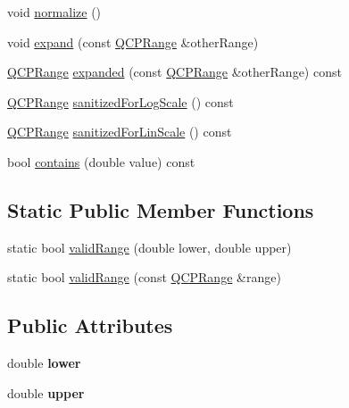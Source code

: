 \begin{DoxyCompactItemize}
\item 
void \mbox{\hyperlink{class_q_c_p_range_af914a7740269b0604d0827c634a878a9}{normalize}} ()
\item 
void \mbox{\hyperlink{class_q_c_p_range_a0fa1bc8048be50d52bea93a8caf08305}{expand}} (const \mbox{\hyperlink{class_q_c_p_range}{Q\+C\+P\+Range}} \&other\+Range)
\item 
\mbox{\hyperlink{class_q_c_p_range}{Q\+C\+P\+Range}} \mbox{\hyperlink{class_q_c_p_range_a9cbfb7cd06eac1839cae981e05c19633}{expanded}} (const \mbox{\hyperlink{class_q_c_p_range}{Q\+C\+P\+Range}} \&other\+Range) const
\item 
\mbox{\hyperlink{class_q_c_p_range}{Q\+C\+P\+Range}} \mbox{\hyperlink{class_q_c_p_range_a3d66288d66e1d6df3636075eb42502ee}{sanitized\+For\+Log\+Scale}} () const
\item 
\mbox{\hyperlink{class_q_c_p_range}{Q\+C\+P\+Range}} \mbox{\hyperlink{class_q_c_p_range_a808751fdd9b17ef52327ba011df2e5f1}{sanitized\+For\+Lin\+Scale}} () const
\item 
bool \mbox{\hyperlink{class_q_c_p_range_ae9842b48b6d38dc5e9607358e3083cc8}{contains}} (double value) const
\end{DoxyCompactItemize}
\subsection*{Static Public Member Functions}
\begin{DoxyCompactItemize}
\item 
static bool \mbox{\hyperlink{class_q_c_p_range_ab38bd4841c77c7bb86c9eea0f142dcc0}{valid\+Range}} (double lower, double upper)
\item 
static bool \mbox{\hyperlink{class_q_c_p_range_a801b964752eaad6219be9d8a651ec2b3}{valid\+Range}} (const \mbox{\hyperlink{class_q_c_p_range}{Q\+C\+P\+Range}} \&range)
\end{DoxyCompactItemize}
\subsection*{Public Attributes}
\begin{DoxyCompactItemize}
\item 
\mbox{\label{class_q_c_p_range_aa3aca3edb14f7ca0c85d912647b91745}} 
double {\bfseries lower}
\item 
\mbox{\label{class_q_c_p_range_ae44eb3aafe1d0e2ed34b499b6d2e074f}} 
double {\bfseries upper}
\end{DoxyCompactItemize}
